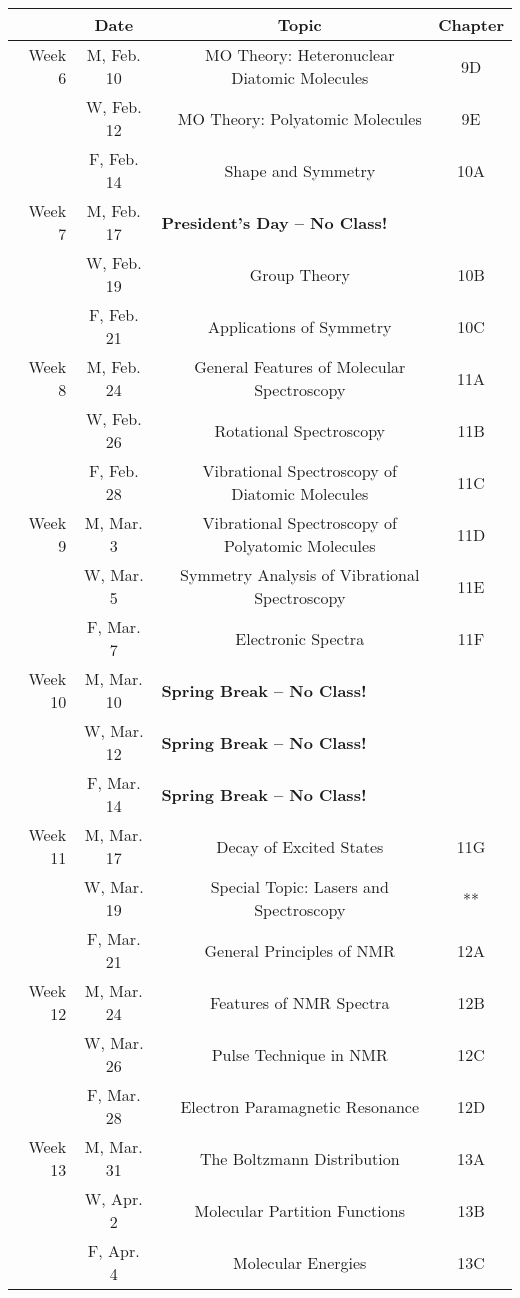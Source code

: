 \documentclass[12pt, letterpaper]{article}
\begin{document}
\begin{tabular}{rcccc}
& Date && Topic & Chapter\\
\midrule
Week 6 & M, Feb. 10&& MO Theory: Heteronuclear Diatomic Molecules & 9D\\
& W, Feb. 12&& MO Theory: Polyatomic Molecules & 9E\\
& F, Feb. 14&& Shape and Symmetry & 10A\\
\midrule
Week 7 & M, Feb. 17& \multicolumn{3}{l}{\textbf{President's Day -- No Class!}}\\
& W, Feb. 19&& Group Theory & 10B\\
& F, Feb. 21&& Applications of Symmetry & 10C\\
\midrule
Week 8 & M, Feb. 24&& General Features of Molecular Spectroscopy & 11A\\
& W, Feb. 26&& Rotational Spectroscopy & 11B\\
& F, Feb. 28&& Vibrational Spectroscopy of Diatomic Molecules & 11C\\
\midrule
Week 9 & M, Mar. 3&& Vibrational Spectroscopy of Polyatomic Molecules & 11D\\
& W, Mar. 5&& Symmetry Analysis of Vibrational Spectroscopy & 11E\\
& F, Mar. 7&& Electronic Spectra & 11F\\
\midrule
Week 10 & M, Mar. 10& \multicolumn{3}{l}{\textbf{Spring Break -- No Class!}}\\
& W, Mar. 12& \multicolumn{3}{l}{\textbf{Spring Break -- No Class!}}\\
& F, Mar. 14& \multicolumn{3}{l}{\textbf{Spring Break -- No Class!}}\\
\midrule
Week 11 & M, Mar. 17&& Decay of Excited States & 11G\\
& W, Mar. 19&& Special Topic: Lasers and Spectroscopy & **\\
& F, Mar. 21&& General Principles of NMR & 12A\\
\midrule
Week 12 & M, Mar. 24&& Features of NMR Spectra & 12B\\
& W, Mar. 26&& Pulse Technique in NMR & 12C\\
& F, Mar. 28&& Electron Paramagnetic Resonance & 12D\\
\midrule
Week 13 & M, Mar. 31&& The Boltzmann Distribution & 13A\\
& W, Apr. 2&& Molecular Partition Functions & 13B\\
& F, Apr. 4&& Molecular Energies & 13C\\
\end{tabular}
\end{document}
